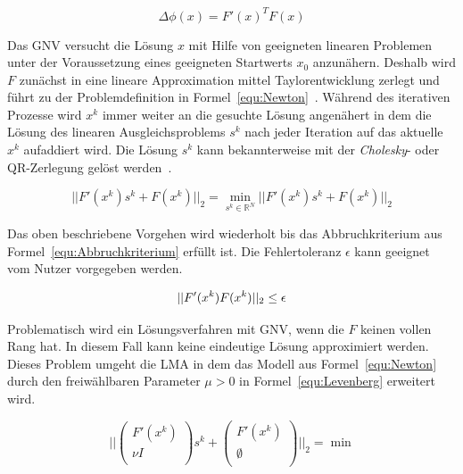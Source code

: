 \begin{equation}
\label{equ:GradPhi}
\Delta\phi(x)=F'(x)^TF(x)
\end{equation}

Das GNV versucht die Lösung $x$ mit Hilfe von geeigneten linearen Problemen unter der Voraussetzung eines geeigneten Startwerts $x_0$ anzunähern. Deshalb wird $F$ zunächst in eine lineare Approximation mittel Taylorentwicklung zerlegt und führt zu der Problemdefinition in Formel~\ref{equ:Newton}~\cite{LevMarquardt}. Während des iterativen Prozesse wird $x^k$ immer weiter an die gesuchte Lösung angenähert in dem die Lösung des linearen Ausgleichsproblems $s^k$ nach jeder Iteration auf das aktuelle $x^k$ aufaddiert wird. Die Lösung $s^k$ kann bekannterweise mit der \textit{Cholesky}- oder QR-Zerlegung gelöst werden~\cite{schwarz2011numerische}.

\begin{equation}
\label{equ:Newton}
||F'(x^k)s^k+F(x^k)||_2 = \min_{s^k \in \mathbb{R}^N}||F'(x^k)s^k+F(x^k)||_2
\end{equation}

Das oben beschriebene Vorgehen wird wiederholt bis das Abbruchkriterium aus Formel~\ref{equ:Abbruchkriterium} erfüllt ist. Die Fehlertoleranz $\epsilon$ kann geeignet vom Nutzer vorgegeben werden.

\begin{equation}
\label{equ:Abbruchkriterium}
||F'(x^k)F(x^k)||_2 \leq \epsilon\\
\end{equation}

Problematisch wird ein Lösungsverfahren mit GNV, wenn die $F$ keinen vollen Rang hat. In diesem Fall kann keine eindeutige Lösung approximiert werden. Dieses Problem umgeht die LMA in dem das Modell aus Formel~\ref{equ:Newton} durch den freiwählbaren Parameter $\mu>0$ in Formel~\ref{equ:Levenberg} erweitert wird. 

\begin{equation}
\label{equ:Levenberg}
||
\begin{pmatrix}
F'(x^k)\\\nu I\\
\end{pmatrix}
s^k+\begin{pmatrix}
F'(x^k)\\\emptyset\\
\end{pmatrix}||_2 = \min
\end{equation}

